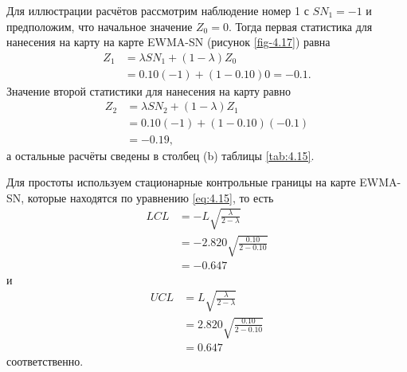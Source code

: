 Для иллюстрации расчётов рассмотрим наблюдение номер 1 с \(SN_1 = -1\) и предположим, что начальное значение \(Z_0 = 0\). Тогда первая статистика для нанесения на карту на карте EWMA-SN (рисунок \ref{fig-4.17}) равна
\begin{align*}
	Z_1 &= \lambda SN_1 + (1 - \lambda)Z_0 \\
	    &= 0.10(-1) + (1 - 0.10)0 = -0.1.
\end{align*}
Значение второй статистики для нанесения на карту равно
\begin{align*}
	Z_2 &= \lambda SN_2 + (1 - \lambda)Z_1 \\
	    &= 0.10(-1) + (1 - 0.10)(-0.1) \\
	    &= -0.19,
\end{align*}
а остальные расчёты сведены в столбец (b) таблицы \ref{tab:4.15}.

Для простоты используем стационарные контрольные границы на карте EWMA-SN, которые находятся по уравнению \eqref{eq:4.15}, то есть
\begin{align*}
	LCL &= -L\sqrt{\frac{\lambda}{2 - \lambda}} \\
	    &= -2.820\sqrt{\frac{0.10}{2 - 0.10}} \\
	    &= -0.647
\end{align*}
и
\begin{align*}
	UCL &= L\sqrt{\frac{\lambda}{2 - \lambda}} \\
	    &= 2.820\sqrt{\frac{0.10}{2 - 0.10}} \\
	    &= 0.647
\end{align*}
соответственно.

